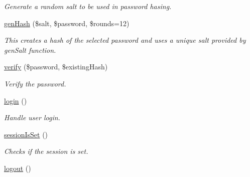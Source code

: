 \begin{DoxyCompactItemize}
\begin{DoxyCompactList}\small\item\em Generate a random salt to be used in password hasing. \end{DoxyCompactList}\item 
\hyperlink{classMember_ad7ab0ff1849464c8378a88205fcc2149}{gen\-Hash} (\$salt, \$password, \$rounds=12)
\begin{DoxyCompactList}\small\item\em This creates a hash of the selected password and uses a unique salt provided by gen\-Salt function. \end{DoxyCompactList}\item 
\hyperlink{classMember_a13daaf7ca65d2456c80f280a3cf9dfef}{verify} (\$password, \$existing\-Hash)
\begin{DoxyCompactList}\small\item\em Verify the password. \end{DoxyCompactList}\item 
\hypertarget{classMember_aedacc5cf03c724d93df1c732489d15a2}{\hyperlink{classMember_aedacc5cf03c724d93df1c732489d15a2}{login} ()}\label{classMember_aedacc5cf03c724d93df1c732489d15a2}

\begin{DoxyCompactList}\small\item\em Handle user login. \end{DoxyCompactList}\item 
\hypertarget{classMember_a1ebfbff8b4159700fd6ba42d3abffa41}{\hyperlink{classMember_a1ebfbff8b4159700fd6ba42d3abffa41}{session\-Is\-Set} ()}\label{classMember_a1ebfbff8b4159700fd6ba42d3abffa41}

\begin{DoxyCompactList}\small\item\em Checks if the session is set. \end{DoxyCompactList}\item 
\hypertarget{classMember_a9d15d39e7d2e9417086f08fd8d2ba52e}{\hyperlink{classMember_a9d15d39e7d2e9417086f08fd8d2ba52e}{logout} ()}\label{classMember_a9d15d39e7d2e9417086f08fd8d2ba52e}


\end{DoxyCompactItemize}
